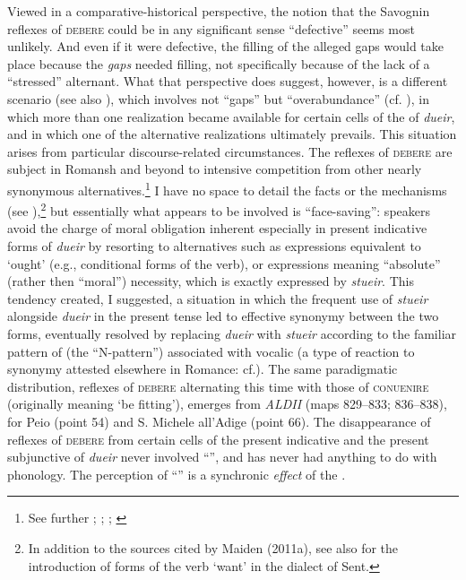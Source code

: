 \documentclass[output=paper,
modfonts
]{LSP/langsci}
\begin{document}
Viewed in a comparative-historical perspective, the notion that the
Savognin reflexes of \textsc{debere} could be in any significant sense
``defective'' seems most unlikely. And even if it were defective, the
 filling of the alleged gaps would take place because the
\emph{gaps} needed filling, not specifically because of the lack of a
``stressed'' alternant. What that perspective does suggest, however, is a
different scenario (see also \citealt[46--49]{maiden2011a}), which involves not
``gaps'' but ``overabundance'' (cf. \citealt{thornton2011}), in which more than one
realization became available for certain cells of the  of
\emph{dueir}, and in which one of the alternative realizations
ultimately prevails. This situation arises from particular
discourse-related circumstances. The reflexes of \textsc{debere} are
subject in Romansh and beyond to intensive competition from other nearly
synonymous alternatives.\footnote{See further \citet[49]{sturzinger1879};
  \citet[84]{tagliavini1926a}; \citet[64]{kramer1976a}; \citet{maiden2011b}} I have no
space to detail the facts or the mechanisms (see \citealt{maiden2011a}),\footnote{In addition to the sources cited by Maiden (2011a), see
  also \citet[166f.]{pult1879a} for the  introduction of forms of the
  verb `want' in the dialect of Sent.} but essentially what appears to
be involved is ``face-saving'': speakers avoid the charge of moral
obligation inherent especially in present indicative forms of
\emph{dueir} by resorting to alternatives such as expressions equivalent
to `ought' (e.g., conditional forms of the verb), or expressions meaning
``absolute'' (rather then ``moral'') necessity, which is exactly expressed
by \emph{stueir}. This tendency created, I suggested, a situation in
which the frequent use of \emph{stueir} alongside \emph{dueir} in the
present tense led to effective synonymy between the two forms,
eventually resolved by replacing \emph{dueir} with \emph{stueir}
according to the familiar pattern of  (the ``N-pattern'')
associated with vocalic  (a type of reaction to synonymy
attested elsewhere in Romance: cf.\citealt{maiden2004a, maiden2006a}). The same
paradigmatic distribution, reflexes of \textsc{debere} alternating this
time with those of \textsc{conuenire} (originally meaning `be fitting'),
emerges from \emph{ALDII} (maps 829--833; 836--838), for Peio (point 54)
and S. Michele all'Adige (point 66). The disappearance of reflexes of
\textsc{debere} from certain cells of the present indicative and the
present subjunctive of \emph{dueir} never involved ``'', and
has never had anything to do with phonology. The perception of
``'' is a synchronic \emph{effect} of the .
\end{document}
